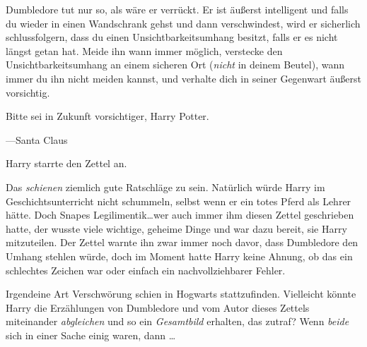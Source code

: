 \begin{writtenNote}
Dumbledore tut nur so, als wäre er verrückt. Er ist äußerst intelligent und falls du wieder in einen Wandschrank gehst und dann verschwindest, wird er sicherlich schlussfolgern, dass du einen Unsichtbarkeitsumhang besitzt, falls er es nicht längst getan hat. Meide ihn wann immer möglich, verstecke den Unsichtbarkeitsumhang an einem sicheren Ort (\emph{nicht} in deinem Beutel), wann immer du ihn nicht meiden kannst, und verhalte dich in seiner Gegenwart äußerst vorsichtig.

Bitte sei in Zukunft vorsichtiger, Harry Potter.

—Santa Claus
\end{writtenNote}

Harry starrte den Zettel an.

Das \emph{schienen} ziemlich gute Ratschläge zu sein. Natürlich würde Harry im Geschichtsunterricht nicht schummeln, selbst wenn er ein totes Pferd als Lehrer hätte. Doch Snapes Legilimentik…wer auch immer ihm diesen Zettel geschrieben hatte, der wusste viele wichtige, geheime Dinge und war dazu bereit, sie Harry mitzuteilen. Der Zettel warnte ihn zwar immer noch davor, dass Dumbledore den Umhang stehlen würde, doch im Moment hatte Harry keine Ahnung, ob das ein schlechtes Zeichen war oder einfach ein nachvollziehbarer Fehler.

Irgendeine Art Verschwörung schien in Hogwarts stattzufinden. Vielleicht könnte Harry die Erzählungen von Dumbledore und vom Autor dieses Zettels miteinander \emph{abgleichen} und so ein \emph{Gesamtbild} erhalten, das zutraf? Wenn \emph{beide} sich in einer Sache einig waren, dann …

